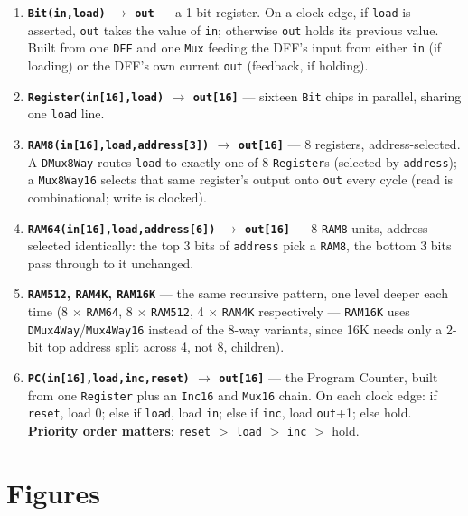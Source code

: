 \documentclass[11pt]{article}
\begin{document}
\begin{enumerate}
  \item \textbf{\texttt{Bit(in,load)} $\to$ \texttt{out}} --- a 1-bit register. On a clock edge, if \texttt{load} is asserted, \texttt{out} takes the value of \texttt{in}; otherwise \texttt{out} holds its previous value. Built from one \texttt{DFF} and one \texttt{Mux} feeding the DFF's input from either \texttt{in} (if loading) or the DFF's own current \texttt{out} (feedback, if holding).
  \item \textbf{\texttt{Register(in[16],load)} $\to$ \texttt{out[16]}} --- sixteen \texttt{Bit} chips in parallel, sharing one \texttt{load} line.
  \item \textbf{\texttt{RAM8(in[16],load,address[3])} $\to$ \texttt{out[16]}} --- 8 registers, address-selected. A \texttt{DMux8Way} routes \texttt{load} to exactly one of 8 \texttt{Register}s (selected by \texttt{address}); a \texttt{Mux8Way16} selects that same register's output onto \texttt{out} every cycle (read is combinational; write is clocked).
  \item \textbf{\texttt{RAM64(in[16],load,address[6])} $\to$ \texttt{out[16]}} --- 8 \texttt{RAM8} units, address-selected identically: the top 3 bits of \texttt{address} pick a \texttt{RAM8}, the bottom 3 bits pass through to it unchanged.
  \item \textbf{\texttt{RAM512}, \texttt{RAM4K}, \texttt{RAM16K}} --- the same recursive pattern, one level deeper each time (8 $\times$ \texttt{RAM64}, 8 $\times$ \texttt{RAM512}, 4 $\times$ \texttt{RAM4K} respectively --- \texttt{RAM16K} uses \texttt{DMux4Way}/\texttt{Mux4Way16} instead of the 8-way variants, since 16K needs only a 2-bit top address split across 4, not 8, children).
  \item \textbf{\texttt{PC(in[16],load,inc,reset)} $\to$ \texttt{out[16]}} --- the Program Counter, built from one \texttt{Register} plus an \texttt{Inc16} and \texttt{Mux16} chain. On each clock edge: if \texttt{reset}, load 0; else if \texttt{load}, load \texttt{in}; else if \texttt{inc}, load \texttt{out}+1; else hold. \textbf{Priority order matters}: \texttt{reset} $>$ \texttt{load} $>$ \texttt{inc} $>$ hold.
\end{enumerate}

\section{Figures}
\end{document}
